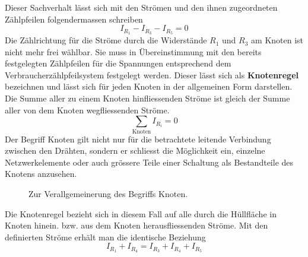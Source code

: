 \newline\newline
Dieser Sachverhalt lässt sich mit den Strömen und den ihnen zugeordneten Zählpfeilen folgendermassen schreiben
\begin{equation}
\boxed{I_{R_1}-I_{R_3}-I_{R_5}=0}
\end{equation}
\noindent Die Zählrichtung für die Ströme durch die Widerstände $R_1$ und $R_3$ am Knoten ist nicht mehr frei wählbar. Sie muss in Übereinstimmung mit den bereits festgelegten Zählpfeilen für die Spannungen entsprechend dem Verbraucherzählpfeilsystem festgelegt werden. Dieser lässt sich als \textbf{Knotenregel} bezeichnen und lässt sich für jeden Knoten in der allgemeinen Form darstellen. Die Summe aller zu einem Knoten hinfliessenden Ströme ist gleich der Summe aller von dem Knoten wegfliessenden Ströme.
\begin{equation}
\boxed{\displaystyle \sum_{\text{Knoten}}I_{R_i}=0}
\end{equation}
Der Begriff Knoten gilt nicht nur für die betrachtete leitende Verbindung zwischen den Drähten, sondern er schliesst die Möglichkeit ein, einzelne Netzwerkelemente oder auch grössere Teile einer Schaltung als Bestandteile des Knotens anzusehen. 
\begin{figure}[H]
\centering
\caption{Zur Verallgemeinerung des Begriffs Knoten.}
\label{fig_IIIi}
\end{figure}
\noindent Die Knotenregel bezieht sich in diesem Fall auf alle durch die Hüllfläche in Knoten hinein. bzw. aus dem Knoten herausfliessenden Ströme. Mit den definierten Ströme erhält man die identische Beziehung
\begin{equation} 
\boxed{I_{R_1}+I_{R_4}=I_{R_3}+I_{R_4}+I_{R_5}}
\end{equation} 
